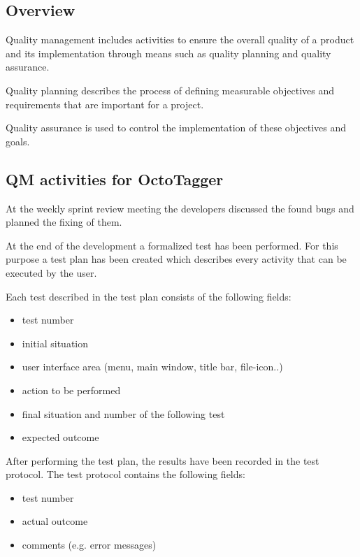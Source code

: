 \subsection{Overview}

Quality management includes activities to ensure the overall quality of a product and its implementation through means such as quality planning and quality assurance. 

Quality planning describes the process of defining measurable objectives and requirements that are important for a project. 

Quality assurance is used to control the implementation of these objectives and goals.

\subsection{QM activities for OctoTagger}

At the weekly sprint review meeting the developers discussed the found bugs and planned the fixing of them.

At the end of  the development a formalized test has been performed. For this purpose a test plan has been created which describes every activity that can be executed by the user.

Each test described in the test plan consists of the following fields: 

\begin{itemize}
\item test number
\item initial situation
\item user interface area (menu, main window, title bar, file-icon..)
\item action to be performed
\item final situation and number of the following test
\item expected outcome
\end{itemize}

After performing the test plan, the results have been recorded in the test protocol. The test protocol contains the following fields:

\begin{itemize}
\item test number
\item actual outcome
\item comments (e.g. error messages) 
\end{itemize}



